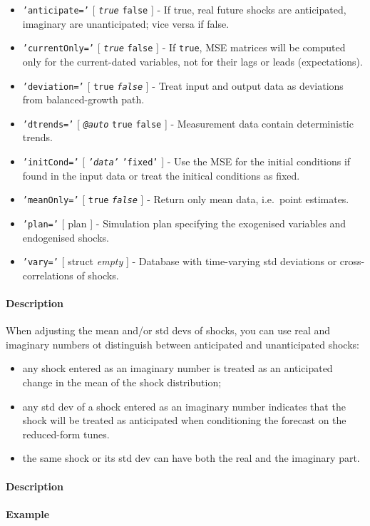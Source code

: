 \begin{itemize}
\item
  \texttt{'anticipate='} {[} \emph{\texttt{true}} \textbar{}
  \texttt{false} {]} - If true, real future shocks are anticipated,
  imaginary are unanticipated; vice versa if false.
\item
  \texttt{'currentOnly='} {[} \emph{\texttt{true}} \textbar{}
  \texttt{false} {]} - If \texttt{true}, MSE matrices will be computed
  only for the current-dated variables, not for their lags or leads
  (expectations).
\item
  \texttt{'deviation='} {[} \texttt{true} \textbar{}
  \emph{\texttt{false}} {]} - Treat input and output data as deviations
  from balanced-growth path.
\item
  \texttt{'dtrends='} {[} \emph{\texttt{@auto}} \textbar{} \texttt{true}
  \textbar{} \texttt{false} {]} - Measurement data contain deterministic
  trends.
\item
  \texttt{'initCond='} {[} \emph{\texttt{'data'}} \textbar{}
  \texttt{'fixed'} {]} - Use the MSE for the initial conditions if found
  in the input data or treat the initical conditions as fixed.
\item
  \texttt{'meanOnly='} {[} \texttt{true} \textbar{}
  \emph{\texttt{false}} {]} - Return only mean data, i.e.~point
  estimates.
\item
  \texttt{'plan='} {[} plan {]} - Simulation plan specifying the
  exogenised variables and endogenised shocks.
\item
  \texttt{'vary='} {[} struct \textbar{} \emph{empty} {]} - Database
  with time-varying std deviations or cross-correlations of shocks.
\end{itemize}

\paragraph{Description}

When adjusting the mean and/or std devs of shocks, you can use real and
imaginary numbers ot distinguish between anticipated and unanticipated
shocks:

\begin{itemize}
\item
  any shock entered as an imaginary number is treated as an anticipated
  change in the mean of the shock distribution;
\item
  any std dev of a shock entered as an imaginary number indicates that
  the shock will be treated as anticipated when conditioning the
  forecast on the reduced-form tunes.
\item
  the same shock or its std dev can have both the real and the imaginary
  part.
\end{itemize}

\paragraph{Description}

\paragraph{Example}


